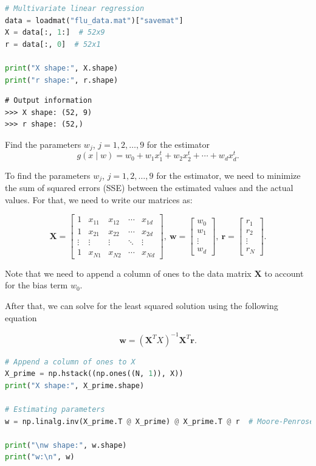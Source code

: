 \documentclass[11pt,a4paper]{article}
\begin{document}
\begin{lstlisting}[language=Python]
# Multivariate linear regression
data = loadmat("flu_data.mat")["savemat"]
X = data[:, 1:]  # 52x9
r = data[:, 0]  # 52x1

print("X shape:", X.shape)
print("r shape:", r.shape)
\end{lstlisting}

\begin{lstlisting}[numbers=none, framexleftmargin=2mm, xleftmargin=2mm, framexrightmargin=2mm, xrightmargin=2mm]
# Output information
>>> X shape: (52, 9)
>>> r shape: (52,)
\end{lstlisting}

\item Find the parameters $w_j$, $j = 1, 2, \ldots, 9$ for the estimator
\[g(x \mid w) = w_0 + w_1 x_1^t + w_2 x_2^t + \cdots + w_d x_d^t.\]

To find the parameters $w_j$, $j = 1, 2, \ldots, 9$ for the estimator, we need to minimize the sum of squared errors (SSE) between the estimated values and the actual values. For that, we need to write our matrices as:

$$\mathbf{X} = \begin{bmatrix} 1 & x_{11} & x_{12} & \cdots & x_{1d} \\ 1 & x_{21} & x_{22} & \cdots & x_{2d} \\ \vdots & \vdots & \vdots & \ddots & \vdots \\ 1 & x_{N1} & x_{N2} & \cdots & x_{Nd} \end{bmatrix}, \: \mathbf{w} = \begin{bmatrix} w_0 \\ w_1 \\ \vdots \\ w_d \end{bmatrix}, \: \mathbf{r} = \begin{bmatrix} r_1 \\ r_2 \\ \vdots \\ r_N \end{bmatrix}.$$

Note that we need to append a column of ones to the data matrix $\mathbf{X}$ to account for the bias term $w_0$.

After that, we can solve for the least squared solution using the following equation

$$\mathbf{w} = (\mathbf{X}^TX)^{-1}\mathbf{X}^T\mathbf{r}.$$

\begin{lstlisting}[language=Python]
# Append a column of ones to X
X_prime = np.hstack((np.ones((N, 1)), X))
print("X shape:", X_prime.shape)

# Estimating parameters
w = np.linalg.inv(X_prime.T @ X_prime) @ X_prime.T @ r  # Moore-Penrose pseudoinverse

print("\nw shape:", w.shape)
print("w:\n", w)
\end{lstlisting}
\end{document}
